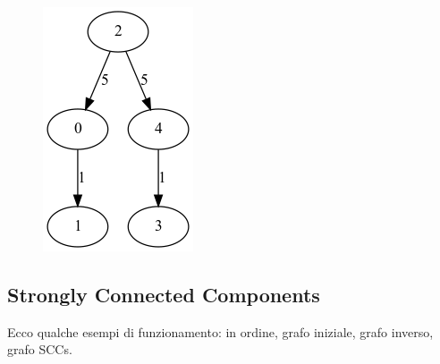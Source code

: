 \documentclass{article}
\begin{document}
\begin{figure}[!htb]
\endminipage\hfill
{}
  \includegraphics[width=\linewidth]{"./output/graph_prim_iteration_5.png"}

\endminipage
\end{figure}


\newpage
\subsection{Strongly Connected Components}
Ecco qualche esempi di funzionamento: in ordine, grafo iniziale, grafo inverso, grafo SCCs.
\end{document}
